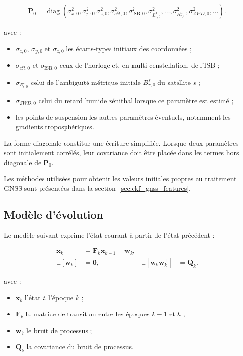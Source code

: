 \begin{align}
\mathbf P_0
=
\operatorname{diag}
\left(
\sigma_{x,0}^2,
\sigma_{y,0}^2,
\sigma_{z,0}^2,
\sigma_{c\delta t,0}^2,
\sigma_{\mathrm{ISB},0}^2,
\sigma_{B_{r,0}^1}^2,\ldots,
\sigma_{B_{r,0}^n}^2,
\sigma_{ZWD,0}^2,\ldots
\right).
\label{eq:ekf_initial_covariance}
\end{align}

avec :

\begin{itemize}
    \item $\sigma_{x,0}$, $\sigma_{y,0}$ et $\sigma_{z,0}$ les écarts-types
    initiaux des coordonnées ;
    \item $\sigma_{c\delta t,0}$ et $\sigma_{\mathrm{ISB},0}$ ceux de
    l'horloge et, en multi-constellation, de l'ISB ;
    \item $\sigma_{B_{r,0}^s}$ celui de l'ambiguïté métrique initiale
    $B_{r,0}^s$ du satellite $s$ ;
    \item $\sigma_{ZWD,0}$ celui du retard humide zénithal lorsque ce paramètre
    est estimé ;
    \item les points de suspension les autres paramètres éventuels, notamment
    les gradients troposphériques.
\end{itemize}

La forme diagonale constitue une écriture simplifiée. Lorsque deux paramètres
sont initialement corrélés, leur covariance doit être placée dans les termes
hors diagonale de $\mathbf P_0$. 

Les méthodes utilisées pour
obtenir les valeurs initiales propres au traitement GNSS sont présentées dans
la section~\ref{sec:ekf_gnss_features}.

\subsection{Modèle d'évolution}

Le modèle suivant exprime l'état courant à partir de l'état précédent :

\begin{align}
\mathbf x_k
&=
\mathbf F_k\mathbf x_{k-1}+\mathbf w_k,
\\
\mathbb E[\mathbf w_k]
&=\mathbf0,
&
\mathbb E[\mathbf w_k\mathbf w_k^{\mathsf T}]
&=\mathbf Q_k.
\label{eq:kalman_prediction}
\end{align}

avec :

\begin{itemize}
    \item $\mathbf x_k$ l'état à l'époque $k$ ;
    \item $\mathbf F_k$ la matrice de transition entre les époques $k-1$ et
    $k$ ;
    \item $\mathbf w_k$ le bruit de processus ;
    \item $\mathbf Q_k$ la covariance du bruit de processus.
\end{itemize}

